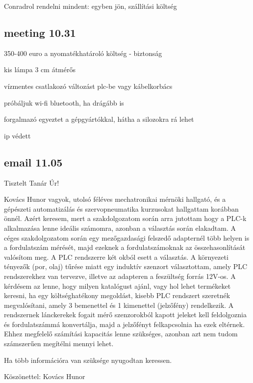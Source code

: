 \documentclass{article}
\begin{document}
	Conradrol rendelni mindent: egyben jön, szállítási költség	
	
	\subsection{meeting 10.31}
	
	350-400 euro a nyomatékhatároló
	költség - biztonság
	
	kis lámpa 3 cm átmérős 
	
	vízmentes csatlakozó változást
	plc-be vagy kábelkorbács
	
	próbáljuk wi-fi bluetooth, ha drágább is
	
	forgalmazó egyeztet a gépgyártókkal, hátha a silozokra rá lehet
	
	ip védett
	
	\subsection{email 11.05}
	
	Tisztelt Tanár Úr!
	
	Kovács Hunor vagyok, utolsó féléves mechatronikai mérnöki hallgató, és a gépészeti automatizálás és szervopneumatika kurzusokat hallgattam korábban önnél. Azért keresem, mert a szakdolgozatom során arra jutottam hogy a PLC-k alkalmazása lenne ideális számomra, azonban a választás során elakadtam.
	A céges szakdolgozatom során egy mezőgazdasági felszedő adapternél több helyen is a fordulatszám mérését, majd ezeknek a fordulatszámoknak az összehasonlítását valósítom meg. A PLC rendszerre két okból esett a választás. A környezeti tényezők (por, olaj) tűrése miatt egy induktív szenzort választottam, amely PLC rendszerekhez van tervezve, illetve az adapteren a feszültség forrás 12V-os.
	A kérdésem az lenne, hogy milyen katalógust ajánl, vagy hol lehet termékeket keresni, ha egy költséghatékony megoldást, kisebb PLC rendszert szeretnék megvalósítani, amely 3 bemenettel és 1 kimenettel (jelzőfény) rendelkezik. 
	A rendszernek lánckerekek fogait mérő szenzorokból kapott jeleket kell feldolgoznia és fordulatszámmá konvertálja, majd a jelzőfényt felkapcsolnia ha ezek eltérnek. Ehhez megfelelő számítási kapacitás lenne szükséges, azonban azt nem tudom számszerűen megítélni mennyi lehet.
	
	Ha több információra van szüksége nyugodtan keressen.
	
	Köszönettel:
	Kovács Hunor
	
\end{document}
